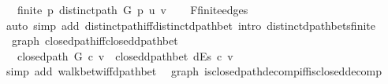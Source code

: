 \begin{isabellebody}
\ \ \ {\isachardoublequoteopen}finite\ {\isacharbraceleft}{\kern0pt}p{\isachardot}{\kern0pt}\ distinct{\isacharunderscore}{\kern0pt}path\ G\ p\ u\ v{\isacharbraceright}{\kern0pt}{\isachardoublequoteclose}%
\endisataginvisible
{\isafoldinvisible}%
%
\isadeliminvisible
\isanewline
%
\endisadeliminvisible
%
\isadelimproof
\ \ %
\endisadelimproof
%
\isatagproof
{}\isamarkupfalse%
\ F{\isachardot}{\kern0pt}finite{\isacharunderscore}{\kern0pt}edges\isanewline
\ \ \isamarkupfalse%
\ {\isacharparenleft}{\kern0pt}auto\ simp\ add{\isacharcolon}{\kern0pt}\ distinct{\isacharunderscore}{\kern0pt}path{\isacharunderscore}{\kern0pt}iff{\isacharunderscore}{\kern0pt}distinct{\isacharunderscore}{\kern0pt}dpath{\isacharunderscore}{\kern0pt}bet\ intro{\isacharcolon}{\kern0pt}\ distinct{\isacharunderscore}{\kern0pt}dpath{\isacharunderscore}{\kern0pt}bets{\isacharunderscore}{\kern0pt}finite{\isacharparenright}{\kern0pt}%
\endisatagproof
{\isafoldproof}%
%
\isadelimproof
\isanewline
%
\endisadelimproof
%
\isadeliminvisible
\isanewline
%
\endisadeliminvisible
%
\isataginvisible
{}\isamarkupfalse%
\ {\isacharparenleft}{\kern0pt}\ graph{\isacharparenright}{\kern0pt}\ closed{\isacharunderscore}{\kern0pt}path{\isacharunderscore}{\kern0pt}iff{\isacharunderscore}{\kern0pt}closed{\isacharunderscore}{\kern0pt}dpath{\isacharunderscore}{\kern0pt}bet{\isacharcolon}{\kern0pt}\isanewline
\ \ \ {\isachardoublequoteopen}closed{\isacharunderscore}{\kern0pt}path\ G\ c\ v\ {\isasymlongleftrightarrow}\ closed{\isacharunderscore}{\kern0pt}dpath{\isacharunderscore}{\kern0pt}bet\ dEs\ c\ v{\isachardoublequoteclose}%
\endisataginvisible
{\isafoldinvisible}%
%
\isadeliminvisible
\isanewline
%
\endisadeliminvisible
%
\isadelimproof
\ \ %
\endisadelimproof
%
\isatagproof
{}\isamarkupfalse%
\ {\isacharparenleft}{\kern0pt}simp\ add{\isacharcolon}{\kern0pt}\ walk{\isacharunderscore}{\kern0pt}betw{\isacharunderscore}{\kern0pt}iff{\isacharunderscore}{\kern0pt}dpath{\isacharunderscore}{\kern0pt}bet{\isacharparenright}{\kern0pt}%
\endisatagproof
{\isafoldproof}%
%
\isadelimproof
\isanewline
%
\endisadelimproof
%
\isadeliminvisible
\isanewline
%
\endisadeliminvisible
%
\isataginvisible
{}\isamarkupfalse%
\ {\isacharparenleft}{\kern0pt}\ graph{\isacharparenright}{\kern0pt}\ is{\isacharunderscore}{\kern0pt}closed{\isacharunderscore}{\kern0pt}path{\isacharunderscore}{\kern0pt}decomp{\isacharunderscore}{\kern0pt}iff{\isacharunderscore}{\kern0pt}is{\isacharunderscore}{\kern0pt}closed{\isacharunderscore}{\kern0pt}decomp{\isacharcolon}{\kern0pt}\isanewline

\end{isabellebody}

